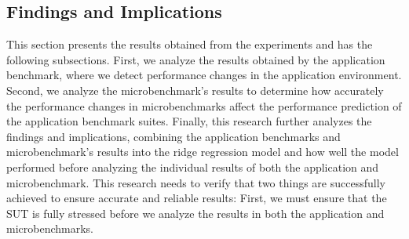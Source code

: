 \subsection{Findings and Implications}
\label{cha:results}
This section presents the results obtained from the experiments and has the following subsections. First, we analyze the results obtained by the application benchmark, where we detect performance changes in the application environment. Second, we analyze the microbenchmark's results to determine how accurately the performance changes in microbenchmarks affect the performance prediction of the application benchmark suites. Finally, this research further analyzes the findings and implications, combining the application benchmarks and microbenchmark's results into the ridge regression model and how well the model performed before analyzing the individual results of both the application and microbenchmark. This research needs to verify that two things are successfully achieved to ensure accurate and reliable results: First, we must ensure that the \ac{SUT} is fully stressed before we analyze the results in both the application and microbenchmarks. 

